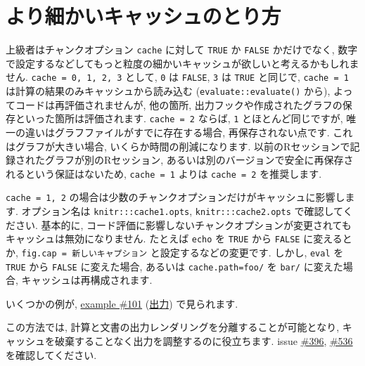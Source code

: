 \documentclass[
  lualatex,ja=standard,jafont=noto-otf]{bxjsreport}
\begin{document}
\hypertarget{ux3088ux308aux7d30ux304bux3044ux30adux30e3ux30c3ux30b7ux30e5ux306eux3068ux308aux65b9}{%
\section*{より細かいキャッシュのとり方}\label{ux3088ux308aux7d30ux304bux3044ux30adux30e3ux30c3ux30b7ux30e5ux306eux3068ux308aux65b9}}

上級者はチャンクオプション \texttt{cache} に対して \texttt{TRUE} か
\texttt{FALSE} かだけでなく,
数字で設定するなどしてもっと粒度の細かいキャッシュが欲しいと考えるかもしれません.
\texttt{cache\ =\ 0,\ 1,\ 2,\ 3} として, \texttt{0} は \texttt{FALSE},
\texttt{3} は \texttt{TRUE} と同じで, \texttt{cache\ =\ 1}
は計算の結果のみキャッシュから読み込む (\texttt{evaluate::evaluate()}
から), よってコードは再評価されませんが, 他の箇所,
出力フックや作成されたグラフの保存といった箇所は評価されます.
\texttt{cache\ =\ 2} ならば, \texttt{1} とほとんど同じですが,
唯一の違いはグラフファイルがすでに存在する場合, 再保存されない点です.
これはグラフが大きい場合, いくらか時間の削減になります.
以前のRセッションで記録されたグラフが別のRセッション,
あるいは別のバージョンで安全に再保存されるという保証はないため,
\texttt{cache\ =\ 1} よりは \texttt{cache\ =\ 2} を推奨します.

\texttt{cache\ =\ 1,\ 2}
の場合は少数のチャンクオプションだけがキャッシュに影響します.
オプション名は \texttt{knitr:::cache1.opts},
\texttt{knitr:::cache2.opts} で確認してください. 基本的に,
コード評価に影響しないチャンクオプションが変更されてもキャッシュは無効になりません.
たとえば \texttt{echo} を \texttt{TRUE} から \texttt{FALSE}
に変えるとか,
\texttt{fig.cap\ =\ \textquotesingle{}新しいキャプション\textquotesingle{}}
と設定するなどの変更です. しかし, \texttt{eval} を \texttt{TRUE} から
\texttt{FALSE} に変えた場合, あるいは
\texttt{cache.path=\textquotesingle{}foo/\textquotesingle{}} を
\texttt{\textquotesingle{}bar/\textquotesingle{}} に変えた場合,
キャッシュは再構成されます.

いくつかの例が, \href{https://github.com/yihui/knitr-examples/}{example
\#101}
(\href{https://github.com/yihui/knitr-examples/blob/master/101-cache-levels.md}{出力})
で見られます.

この方法では, 計算と文書の出力レンダリングを分離することが可能となり,
キャッシュを破棄することなく出力を調整するのに役立ちます. issue
\href{https://github.com/yihui/knitr/issues/396}{\#396},
\href{https://github.com/yihui/knitr/issues/536}{\#536}
を確認してください.
\end{document}
